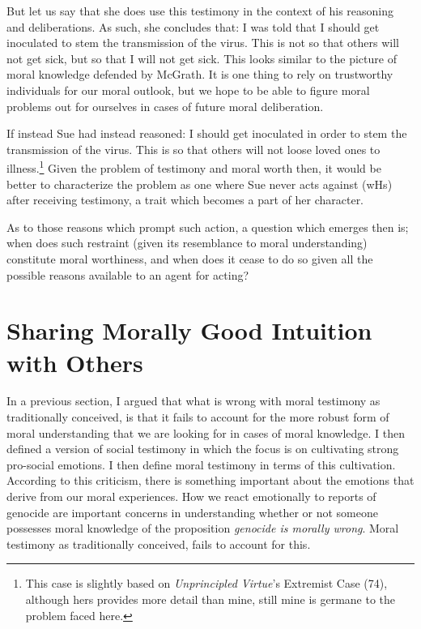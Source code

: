 \documentclass[
  12pt,
]{book}
\theoremstyle{definition}
\theoremstyle{definition}
\theoremstyle{definition}
\theoremstyle{definition}
\theoremstyle{remark}
\begin{document}
But let us say that she does use this testimony in the context of his reasoning and deliberations. As such, she concludes that: I was told that I should get inoculated to stem the transmission of the virus. This is not so that others will not get sick, but so that I will not get sick. This looks similar to the picture of moral knowledge defended by McGrath. It is one thing to rely on trustworthy individuals for our moral outlook, but we hope to be able to figure moral problems out for ourselves in cases of future moral deliberation.

If instead Sue had instead reasoned: I should get inoculated in order to stem the transmission of the virus. This is so that others will not loose loved ones to illness.\footnote{This case is slightly based on \emph{Unprincipled {Virtue}}'s Extremist Case (74), although hers provides more detail than mine, still mine is germane to the problem faced here.} Given the problem of testimony and moral worth then, it would be better to characterize the problem as one where Sue never acts against (wHs) after receiving testimony, a trait which becomes a part of her character.

As to those reasons which prompt such action, a question which emerges then is; when does such restraint (given its resemblance to moral understanding) constitute moral worthiness, and when does it cease to do so given all the possible reasons available to an agent for acting?

\chapter{Sharing Morally Good Intuition with Others}\label{sharing-morally-good-intuition-with-others}

In a previous section, I argued that what is wrong with moral testimony as traditionally conceived, is that it fails to account for the more robust form of moral understanding that we are looking for in cases of moral knowledge. I then defined a version of social testimony in which the focus is on cultivating strong pro-social emotions. I then define moral testimony in terms of this cultivation. According to this criticism, there is something important about the emotions that derive from our moral experiences. How we react emotionally to reports of genocide are important concerns in understanding whether or not someone possesses moral knowledge of the proposition \emph{genocide is morally wrong}. Moral testimony as traditionally conceived, fails to account for this.
\end{document}
